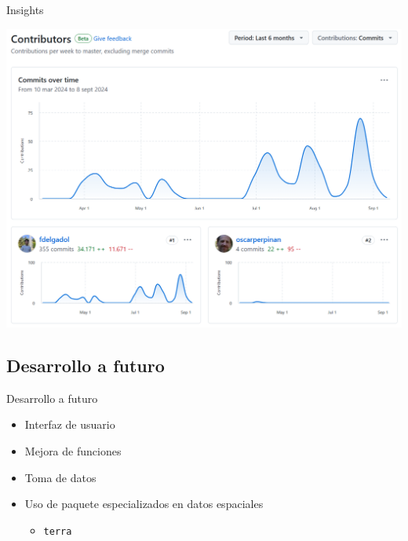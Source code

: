 \documentclass[aspectratio=169, usenames,svgnames,dvipsnames]{beamer}
\begin{document}
\begin{frame}[label={sec:orgd29b982}]{Insights}
\begin{center}
\includegraphics[height=0.9\textheight]{../figuras/contributors.png}
\end{center}
\end{frame}
\subsection{Desarrollo a futuro}
\label{sec:orga8a036e}
\begin{frame}[label={sec:org131cd97},fragile]{Desarrollo a futuro}
 \begin{itemize}
\item Interfaz de usuario

\item Mejora de funciones

\item Toma de datos

\item Uso de paquete especializados en datos espaciales
\begin{itemize}
\item \texttt{terra}
\end{itemize}
\end{itemize}
\end{frame}
\end{document}
